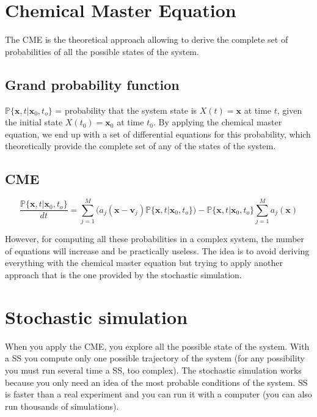 \section{Chemical Master Equation}
The CME is the theoretical approach allowing to derive the complete set of probabilities of all the possible states of the system.

  \subsection{Grand probability function}
  $\mathbb{P}\{\mathbf{x},t|\mathbf{x}_0,t_o\}$ = probability that the system state is $X(t) = \mathbf{x}$ at time $t$, given the initial state $X(t_0) = \mathbf{x}_0$ at time $t_0$.
  By applying the chemical master equation, we end up with a set of differential equations for this probability, which theoretically provide the complete set of any of the states of the system.

  \subsection{CME}

  $$\frac{\mathbb{P}\{\mathbf{x},t|\mathbf{x}_0,t_o\}}{dt}= \sum_{j=1}^{M}(a_j(\mathbf{x}-\mathbf{v}_j)\mathbb{P}\{\mathbf{x},t|\mathbf{x}_0,t_o\})- \mathbb{P}\{\mathbf{x},t|\mathbf{x}_0,t_o\}\sum^M_{j=1}a_j(\mathbf{x})$$

\noindent
  However, for computing all these probabilities in a complex system, the number of equations will increase and be practically useless.
  The idea is to avoid deriving everything with the chemical master equation but trying to apply another approach that is the one provided by the stochastic simulation.

\section{Stochastic simulation}
When you apply the CME, you explore all the possible state of the system. With a SS you compute only one possible trajectory of the system (for any possibility you must run several time a SS, too complex).
The stochastic simulation works because you only need an idea of the most probable conditions of the system.
SS is faster than a real experiment and you can run it with a computer (you can also run thousands of simulations).

